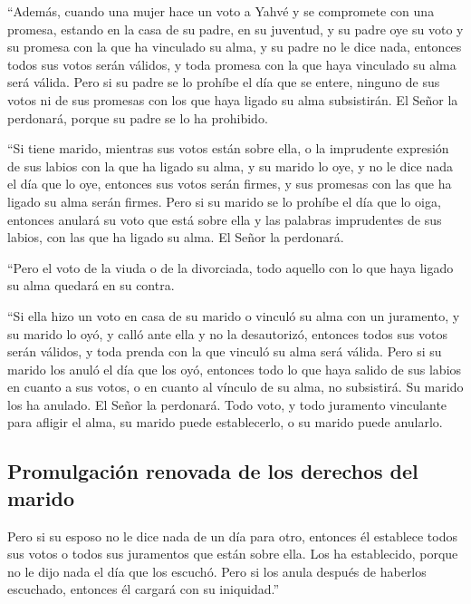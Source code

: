  ``Además, cuando una mujer hace un voto a Yahvé y se
compromete con una promesa, estando en la casa de su padre, en su
juventud,  y su padre oye su voto y su promesa con la que
ha vinculado su alma, y su padre no le dice nada, entonces todos sus
votos serán válidos, y toda promesa con la que haya vinculado su alma
será válida.  Pero si su padre se lo prohíbe el día que se
entere, ninguno de sus votos ni de sus promesas con los que haya ligado
su alma subsistirán. El Señor la perdonará, porque su padre se lo ha
prohibido.

 ``Si tiene marido, mientras sus votos están sobre ella, o
la imprudente expresión de sus labios con la que ha ligado su alma,
 y su marido lo oye, y no le dice nada el día que lo oye,
entonces sus votos serán firmes, y sus promesas con las que ha ligado su
alma serán firmes.  Pero si su marido se lo prohíbe el día
que lo oiga, entonces anulará su voto que está sobre ella y las palabras
imprudentes de sus labios, con las que ha ligado su alma. El Señor la
perdonará.

 ``Pero el voto de la viuda o de la divorciada, todo
aquello con lo que haya ligado su alma quedará en su contra.

 ``Si ella hizo un voto en casa de su marido o vinculó su
alma con un juramento,  y su marido lo oyó, y calló ante
ella y no la desautorizó, entonces todos sus votos serán válidos, y toda
prenda con la que vinculó su alma será válida.  Pero si
su marido los anuló el día que los oyó, entonces todo lo que haya salido
de sus labios en cuanto a sus votos, o en cuanto al vínculo de su alma,
no subsistirá. Su marido los ha anulado. El Señor la perdonará.
 Todo voto, y todo juramento vinculante para afligir el
alma, su marido puede establecerlo, o su marido puede anularlo.

\hypertarget{promulgaciuxf3n-renovada-de-los-derechos-del-marido}{%
\subsection{Promulgación renovada de los derechos del
marido}\label{promulgaciuxf3n-renovada-de-los-derechos-del-marido}}

 Pero si su esposo no le dice nada de un día para otro,
entonces él establece todos sus votos o todos sus juramentos que están
sobre ella. Los ha establecido, porque no le dijo nada el día que los
escuchó.  Pero si los anula después de haberlos
escuchado, entonces él cargará con su iniquidad.''

